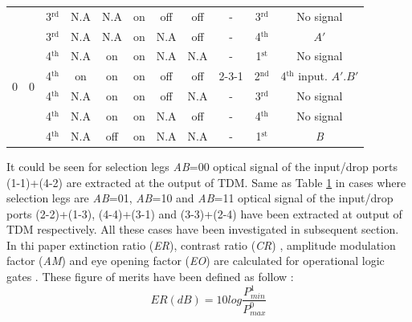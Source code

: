 \documentclass{osa-article}
\begin{document}
\begin{table}[H]
{\begin{tabular}{c|c|c|c|c|c|c|c|c|c|c}
\cline{3-11}
& & 3$^{\text{rd}}$& N.A& N.A& on&off& off& -& 3$^{\text{rd}}$& No signal\\
\cline{3-11}
& & 3$^{\text{rd}}$& N.A& N.A& on& N.A& off& -& 4$^{\text{th}}$& $A'$\\
\hline 
\multirow{4}{*}{0}& \multirow{4}{*}{0}& 4$^{\text{th}}$& N.A& on& on& N.A& N.A&-& 1$^{\text{st}}$& No signal\\
\cline{3-11}
& & 4$^{\text{th}}$& on& on& on& off& off& 2-3-1& 2$^{\text{nd}}$&4$^{\text{th}}$ input. $A'$.$B'$\\
\cline{3-11}
& & 4$^{\text{th}}$& N.A& on& on& off& N.A& -& 3$^{\text{rd}}$& No signal\\ 
\cline{3-11}
& & 4$^{\text{th}}$& N.A& on& on& N.A& off& -& 4$^{\text{th}}$& No signal\\
\cline{3-11}
& & 4$^{\text{th}}$& N.A& off& on& N.A& N.A& -& 1$^{\text{st}}$& \textit B\\
\hline 
\end{tabular}
}
\label{tab2} %
\end{table}

It could be seen for selection legs \textit{A}\textit{B}=00 optical signal of the input/drop ports (1-1)+(4-2) are extracted at the output of TDM. Same as Table \ref{tab2} in cases where selection legs are  \textit{A}\textit{B}=01,  \textit{A}\textit{B}=10 and  \textit{A}\textit{B}=11 optical signal of the input/drop ports (2-2)+(1-3), (4-4)+(3-1) and (3-3)+(2-4) have been extracted at output of TDM respectively. All these cases have been investigated in subsequent section.\\
In thi paper extinction ratio (\textit {ER}), contrast ratio (\textit {CR}) , amplitude modulation factor (\textit {AM}) and eye opening factor (\textit {EO}) are calculated for operational logic gates \cite{houbavlis2004performance}. These figure of merits have been defined as follow :
\begin{equation}
ER(dB)=10log\frac{P^1_{min}} {P^0_{max}}
\label{eq:1}
\end{equation}
\end{document}
